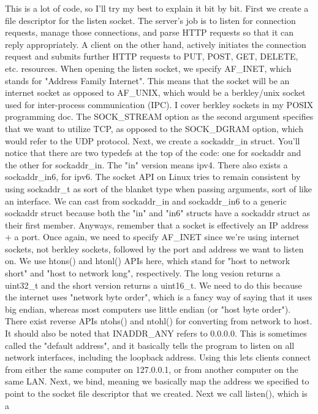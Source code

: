 \documentclass{article}
\begin{document}
This is a lot of code, so I'll try my best to explain it bit by bit. First we create a file descriptor for the
listen socket. The server's job is to listen for connection requests, manage those connections, and parse
HTTP requests so that it can reply appropriately. A client on the other hand, actively initiates the connection
request and submits further HTTP requests to PUT, POST, GET, DELETE, etc. resources. When opening the
listen socket, we specify AF\_INET, which stands for "Address Family Internet". This means that the socket will
be an internet socket as opposed to AF\_UNIX, which would be a berkley/unix socket used for inter-process
communication (IPC). I cover berkley sockets in my POSIX programming doc. The SOCK\_STREAM option as the
second argument specifies that we want to utilize TCP, as opposed to the SOCK\_DGRAM option, which would
refer to the UDP protocol. Next, we create a sockaddr\_in struct. You'll notice that there are two typedefs
at the top of the code: one for sockaddr and the other for sockaddr\_in. The "in" version means ipv4. There
also exists a sockaddr\_in6, for ipv6. The socket API on Linux tries to remain consistent by using sockaddr\_t
as sort of the blanket type when passing arguments, sort of like an interface. We can cast from sockaddr\_in
and sockaddr\_in6 to a generic sockaddr struct because both the "in" and "in6" structs have a sockaddr struct
as their first member. Anyways, remember that a socket is effectively an IP address + a port. Once again, we
need to specify AF\_INET since we're using internet sockets, not berkley sockets, followed by the port and
address we want to listen on. We use htons() and htonl() APIs here, which stand for "host to network short"
and "host to network long", respectively. The long vesion returns a uint32\_t and the short version returns a
uint16\_t. We need to do this because the internet uses "network byte order", which is a fancy way of saying
that it uses big endian, whereas most computers use little endian (or "host byte order"). There exist reverse
APIs ntohs() and ntohl() for converting from network to host. It should also be noted that INADDR\_ANY refers
to 0.0.0.0. This is sometimes called the "default address", and it basically tells the program to listen on
all network interfaces, including the loopback address. Using this lets clients connect from either the same
computer on 127.0.0.1, or from another computer on the same LAN. Next, we bind, meaning we basically map the
address we specified to point to the socket file descriptor that we created. Next we call listen(), which is a
\end{document}
